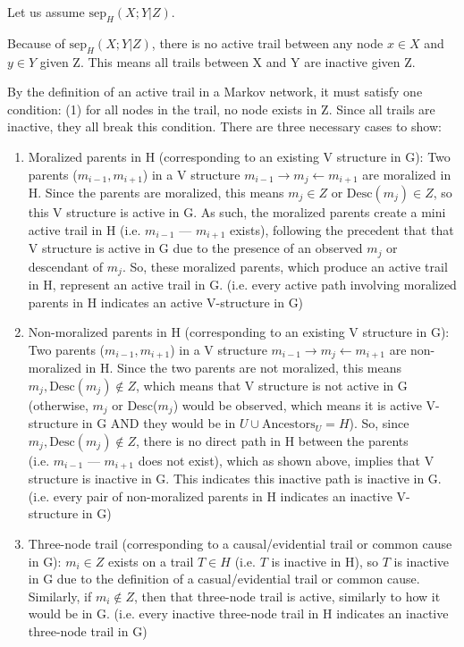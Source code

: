 \documentclass[12pt]{article}
\begin{document}
Let us assume $\text{sep}_H(X; Y \vert Z)$.

Because of $\text{sep}_H(X; Y \vert Z)$, there is no active trail between any node $x\in X$ and $y\in Y$ given Z. This means all trails between X and Y are inactive given Z.

By the definition of an active trail in a Markov network, it must satisfy one condition: (1) for all nodes in the trail, no node exists in Z. Since all trails are inactive, they all break this condition. There are three necessary cases to show:

\begin{enumerate}
	\item Moralized parents in H (corresponding to an existing V structure in G): Two parents ($m_{i-1}, m_{i+1}$) in a V structure $m_{i-1} \rightarrow m_j \leftarrow m_{i+1}$ are moralized in H. Since the parents are moralized, this means $m_j\in Z$ or $\text{Desc}(m_j)\in Z$, so this V structure is active in G. As such, the moralized parents create a mini active trail in H (i.e. $m_{i-1}$ --- $m_{i+1}$ exists), following the precedent that that V structure is active in G due to the presence of an observed $m_j$ or descendant of $m_j$. So, these moralized parents, which produce an active trail in H, represent an active trail in G. (i.e. every active path involving moralized parents in H indicates an active V-structure in G)
	\item Non-moralized parents in H (corresponding to an existing V structure in G): Two parents ($m_{i-1}, m_{i+1}$) in a V structure $m_{i-1} \rightarrow m_j \leftarrow m_{i+1}$ are non-moralized in H. Since the two parents are not moralized, this means $m_j, \text{Desc}(m_j)\notin Z$, which means that V structure is not active in G (otherwise, $m_j$ or Desc($m_j$) would be observed, which means it is active V-structure in G AND they would be in $U \cup \text{Ancestors}_U = H$). So, since $m_j, \text{Desc}(m_j)\notin Z$, there is no direct path in H between the parents \\(i.e. $m_{i-1}$ --- $m_{i+1}$ does not exist), which as shown above, implies that V structure is inactive in G. This indicates this inactive path is inactive in G. (i.e. every pair of non-moralized parents in H indicates an inactive V-structure in G)
	\item Three-node trail (corresponding to a causal/evidential trail or common cause in G): $m_i\in Z$ exists on a trail $T \in H$ (i.e. $T$ is inactive in H), so $T$ is inactive in G due to the definition of a casual/evidential trail or common cause. Similarly, if $m_i\notin Z$, then that three-node trail is active, similarly to how it would be in G. (i.e. every inactive three-node trail in H indicates an inactive three-node trail in G)
\end{enumerate}
\end{document}
